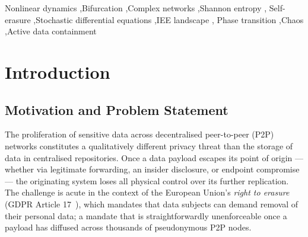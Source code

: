 \documentclass[review,12pt]{elsarticle}
\begin{document}
\begin{frontmatter}
\begin{abstract}
Numerical experiments across Erd\H{o}s-R\'enyi, Barab\'asi-Albert, and
Watts-Strogatz topologies ($n \in \{50, 100, 200, 500\}$) confirm the
bifurcation structure: ELAPSE suppresses IEE by at least $9\times$ relative
to the uncontrolled baseline at $n = 500$.  Under ER-only weight training
(primary evaluation), Social Cascade (M5) achieves lower per-topology IEE on
all three topologies; topology-matched retraining closes the gap to within
$5$--$8\%$ on BA/WS and yields M6 outperforming M5 by $5.9\%$ on ER
($n=100$), with $1.7\%$ lower topology-averaged IEE across all mechanisms.
The ensemble's principal advantage over any single mechanism is \emph{robustness}:
it dominates the bang-bang policy under threshold overestimation (the
practically common case of conservative calibration) and limits IEE
degradation under hub-throttling adversarial attacks to ${\leq}6.6\%$,
compared to complete deletion failure for the bang-bang baseline.
\end{abstract}

\begin{keyword}
Nonlinear dynamics \sep Bifurcation \sep Complex networks \sep Shannon entropy \sep
Self-erasure \sep Stochastic differential equations \sep IEE landscape \sep
Phase transition \sep Chaos \sep Active data containment
\end{keyword}

\end{frontmatter}

\section{Introduction}
\label{sec:intro}

\subsection{Motivation and Problem Statement}

The proliferation of sensitive data across decentralised peer-to-peer (P2P)
networks constitutes a qualitatively different privacy threat than the storage
of data in centralised repositories. Once a data payload escapes its point of
origin --- whether via legitimate forwarding, an insider disclosure, or
endpoint compromise --- the originating system loses all physical control over
its further replication. The challenge is acute in the context of the European
Union's \emph{right to erasure} (GDPR Article 17~\cite{gdpr2016}), which mandates
that data subjects can demand removal of their personal data; a mandate that is
straightforwardly unenforceable once a payload has diffused across thousands
of pseudonymous P2P nodes.
\end{document}
